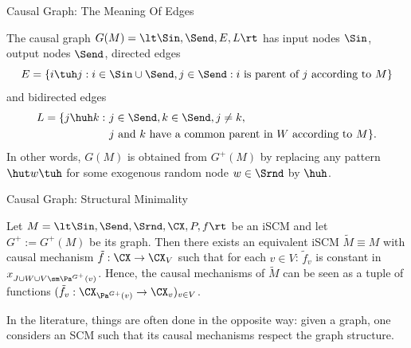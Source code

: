 \begin{frame}{Causal Graph: The Meaning Of Edges}
\begin{Rem}[\ref{rem:scm_graph}]
  The causal graph $G(M) = \lt \Sin, \Send, E, L \rt$ has input nodes $\Sin$, output nodes $\Send$, directed edges
  $$E = \{i \tuh j : i \in \Sin\cup\Send, j\in\Send: \text{$i$ is parent of $j$ according to $M$}\}$$
  and bidirected edges
  \begin{equation*}\begin{split}
    L = \{j \huh k : \ & j \in \Send, k \in \Send, j \ne k, \\
          & \text{$j$ and $k$ have a common parent in $W$ according to $M$}\}.
  \end{split}\end{equation*}
  In other words, $G(M)$ is obtained from $G^+(M)$ by replacing any pattern $\hut w \tuh$ for some
  exogenous random node $w \in \Srnd$ by $\huh$.
\end{Rem}
\end{frame}

\begin{frame}{Causal Graph: Structural Minimality}
  \begin{Rem}[\ref{rem:iscm_structurally_minimal}]
  Let $M = \lt \Sin, \Send, \Srnd, \CX, P, f \rt$ be an iSCM and let $G^+ := G^+(M)$ be its graph.
  Then there exists an equivalent iSCM $\tilde{M} \equiv M$ with causal mechanism $\tilde{f} : \CX \to \CX_V$ such that for each $v \in V$:
  $\tilde f_v$ is constant in $x_{J \cup W \cup V \sm \Pa^{G^+}(v)}$.
  Hence, the causal mechanisms of $\tilde{M}$ can be seen as a tuple of functions $(\tilde f_v : \CX_{\Pa^{G+}(v)} \to \CX_v)_{v \in V}$.
  \end{Rem}
  In the literature, things are often done in the opposite way: given a graph, one considers an SCM such that its causal mechanisms respect the graph structure.
\end{frame}

